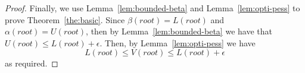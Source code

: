 \documentclass[letterpaper]{article} %
\newcommand{\MM}{\mathit{V}}
\newcommand{\pess}{\mathit{L}}
\newcommand{\opti}{\mathit{U}}
\newcommand{\vmax}{v_{\text{max}}}
\newcommand{\vmin}{v_{\text{min}}}
\begin{document}
\begin{proof}





Finally, we use Lemma~\ref{lem:bounded-beta} and Lemma~\ref{lem:opti-pess} to prove Theorem~\ref{the:basic}. 
Since $\beta(root)=\pess(root)$ 
and $\alpha(root)=\opti(root)$, then by Lemma~\ref{lem:bounded-beta} we have that
$\opti(root)\leq \pess(root)+\epsilon$.
Then, by Lemma~\ref{lem:opti-pess} we have
\begin{equation}
\pess(root) \leq \MM(root) \leq \pess(root)+\epsilon
\end{equation}
as required.
\end{proof}



\end{document}
